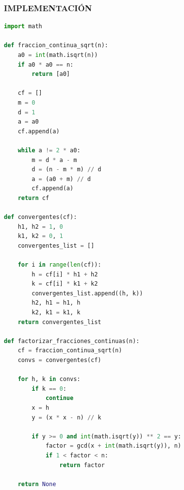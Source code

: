 \subsubsection{IMPLEMENTACIÓN}
\begin{lstlisting}[language=Python]
import math

def fraccion_continua_sqrt(n):
    a0 = int(math.isqrt(n))
    if a0 * a0 == n:
        return [a0]
    
    cf = []
    m = 0
    d = 1
    a = a0
    cf.append(a)
    
    while a != 2 * a0:
        m = d * a - m
        d = (n - m * m) // d
        a = (a0 + m) // d
        cf.append(a)
    return cf

def convergentes(cf):
    h1, h2 = 1, 0
    k1, k2 = 0, 1
    convergentes_list = []
    
    for i in range(len(cf)):
        h = cf[i] * h1 + h2
        k = cf[i] * k1 + k2
        convergentes_list.append((h, k))
        h2, h1 = h1, h
        k2, k1 = k1, k
    return convergentes_list

def factorizar_fracciones_continuas(n):
    cf = fraccion_continua_sqrt(n)
    convs = convergentes(cf)
    
    for h, k in convs:
        if k == 0:
            continue
        x = h
        y = (x * x - n) // k
        
        if y >= 0 and int(math.isqrt(y)) ** 2 == y:
            factor = gcd(x + int(math.isqrt(y)), n)
            if 1 < factor < n:
                return factor
    
    return None
\end{lstlisting}


